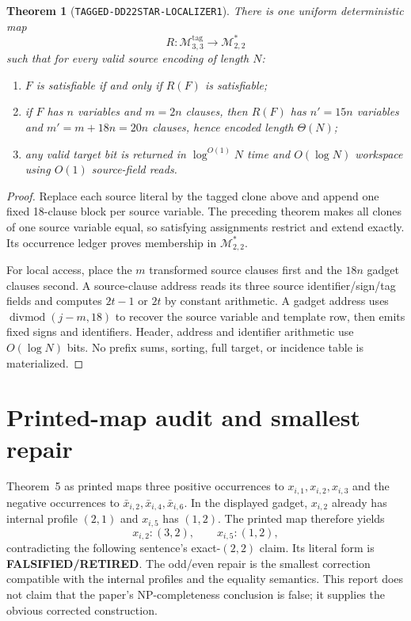 \documentclass[11pt]{article}
\newtheorem{theorem}{Theorem}
\newcommand{\RETIRED}{\textbf{FALSIFIED/RETIRED}}
\newcommand{\Mthree}{\mathcal M_{3,3}^{\mathrm{tag}}}
\newcommand{\Mstar}{\mathcal M_{2,2}^{*}}
\begin{document}
\begin{theorem}[\texttt{TAGGED-DD22STAR-LOCALIZER1}]
There is one uniform deterministic map
\[
 R:\Mthree\longrightarrow\Mstar
\]
such that for every valid source encoding of length $N$:
\begin{enumerate}[leftmargin=*]
\item $F$ is satisfiable if and only if $R(F)$ is satisfiable;
\item if $F$ has $n$ variables and $m=2n$ clauses, then $R(F)$ has
$n'=15n$ variables and $m'=m+18n=20n$ clauses, hence encoded length
$\Theta(N)$;
\item any valid target bit is returned in $\log^{O(1)}N$ time and
$O(\log N)$ workspace using $O(1)$ source-field reads.
\end{enumerate}
\end{theorem}
\begin{proof}
Replace each source literal by the tagged clone above and append one fixed
18-clause block per source variable.  The preceding theorem makes all clones
of one source variable equal, so satisfying assignments restrict and extend
exactly.  Its occurrence ledger proves membership in $\Mstar$.

For local access, place the $m$ transformed source clauses first and the
$18n$ gadget clauses second.  A source-clause address reads its three source
identifier/sign/tag fields and computes $2t-1$ or $2t$ by constant arithmetic.
A gadget address uses $\operatorname{divmod}(j-m,18)$ to recover the source
variable and template row, then emits fixed signs and identifiers.  Header,
address and identifier arithmetic use $O(\log N)$ bits.  No prefix sums,
sorting, full target, or incidence table is materialized.
\end{proof}

\section{Printed-map audit and smallest repair}

Theorem~5 as printed maps three positive occurrences to
$x_{i,1},x_{i,2},x_{i,3}$ and the negative occurrences to
$\bar x_{i,2},\bar x_{i,4},\bar x_{i,6}$.  In the displayed gadget,
$x_{i,2}$ already has internal profile $(2,1)$ and $x_{i,5}$ has $(1,2)$.
The printed map therefore yields
\[
 x_{i,2}:(3,2),\qquad x_{i,5}:(1,2),
\]
contradicting the following sentence's exact-$(2,2)$ claim.  Its literal
form is \RETIRED.  The odd/even repair is the smallest correction compatible
with the internal profiles and the equality semantics.  This report does not
claim that the paper's NP-completeness conclusion is false; it supplies the
obvious corrected construction.
\end{document}
